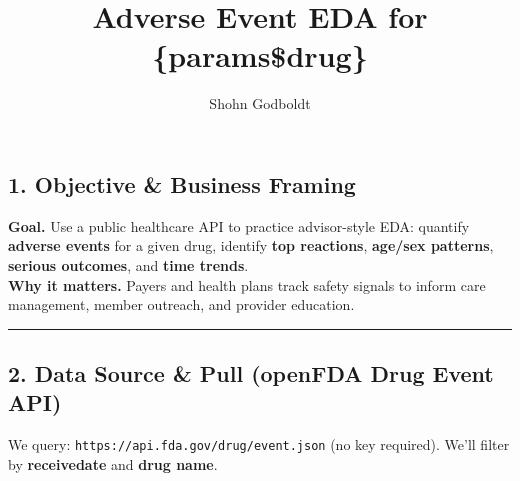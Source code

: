 \documentclass[
  letterpaper,
  DIV=11,
  numbers=noendperiod]{scrartcl}
\title{Adverse Event EDA for \{params\$drug\}}
\author{Shohn Godboldt}
\date{}
\begin{document}
\maketitle


\subsection{1. Objective \& Business
Framing}\label{objective-business-framing}

\textbf{Goal.} Use a public healthcare API to practice advisor-style
EDA: quantify \textbf{adverse events} for a given drug, identify
\textbf{top reactions}, \textbf{age/sex patterns}, \textbf{serious
outcomes}, and \textbf{time trends}.\\
\textbf{Why it matters.} Payers and health plans track safety signals to
inform care management, member outreach, and provider education.

\begin{center}\rule{0.5\linewidth}{0.5pt}\end{center}

\subsection{2. Data Source \& Pull (openFDA Drug Event
API)}\label{data-source-pull-openfda-drug-event-api}

We query: \texttt{https://api.fda.gov/drug/event.json} (no key
required). We'll filter by \textbf{receivedate} and \textbf{drug name}.
\end{document}
